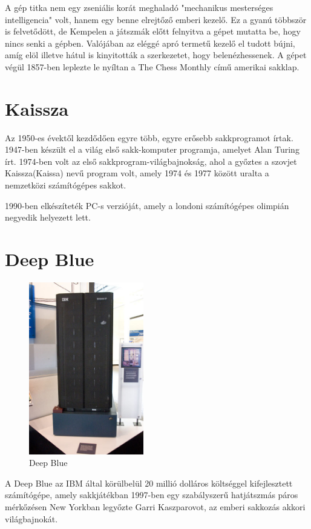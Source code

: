 \documentclass[twoside, a4paper, 12pt]{book}
\begin{document}
A gép titka nem egy zseniális korát meghaladó "mechanikus mesterséges intelligencia" volt, hanem egy benne elrejtőző emberi kezelő. Ez a gyanú többször is felvetődött, de Kempelen a játszmák előtt felnyitva a gépet mutatta be, hogy nincs senki a gépben. Valójában az eléggé apró termetű kezelő el tudott bújni, amíg elöl illetve hátul is kinyitották a szerkezetet, hogy belenézhessenek. A gépet végül 1857-ben leplezte le nyíltan a The Chess Monthly című amerikai sakklap.\cite{MechanicalTurkHu}\cite{MechanicalTurkEn}\cite{CsodakKonyveHu}

\section{Kaissza}
Az 1950-es évektől kezdődően egyre több, egyre erősebb sakkprogramot írtak. 1947-ben készült el a világ első sakk-komputer programja, amelyet Alan Turing írt. 1974-ben volt az első sakkprogram-világbajnokság, ahol a győztes a szovjet Kaissza(\foreignlanguage{russian}{Kaissa}) nevű program volt, amely 1974 és 1977 között uralta a nemzetközi számítógépes sakkot.\cite{chessProgramsHu}

1990-ben elkészíteték PC-s verzióját, amely a londoni számítógépes olimpián negyedik helyezett lett.\cite{KaissaEn}
\newline \\
\section{Deep Blue}
\begin{figure}
	\caption{Deep Blue}
	\label{fig:deepblue}
	\includegraphics[width=5.0cm]{img/deepblue.jpg}
\end{figure}
A Deep Blue az IBM által körülbelül 20 millió dolláros költséggel kifejlesztett számítógépe, amely sakkjátékban 1997-ben egy szabályszerű hatjátszmás páros mérkőzésen New Yorkban legyőzte Garri Kaszparovot, az emberi sakkozás akkori világbajnokát.
\end{document}
